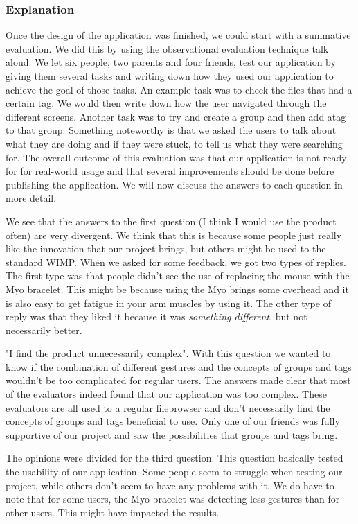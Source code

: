 \documentclass{article}
\begin{document}
\subsubsection{Explanation}

Once the design of the application was finished, we could start with a summative evaluation. We did this by using the observational evaluation technique talk aloud. We let six people, two parents and four friends, test our application by giving them several tasks and writing down how they used our application to achieve the goal of those tasks. An example task was to check the files that had a certain tag. We would then write down how the user navigated through the different screens. Another task was to try and create a group and then add atag to that group. Something noteworthy is that we asked the users to talk about what they are doing and if they were stuck, to tell us what they were searching for. The overall outcome of this evaluation was that our application is not ready for for real-world usage and that several improvements should be done before publishing the application. We will now discuss the answers to each question in more detail.

We see that the answers to the first question (I think I would use the product often) are very divergent. We think that this is because some people just really like the innovation that our project brings, but others might be used to the standard WIMP. When we asked for some feedback, we got two types of replies. The first type was that people didn't see the use of replacing the mouse with the Myo bracelet. This might be because using the Myo brings some overhead and it is also easy to get fatigue in your arm muscles by using it. The other type of reply was that they liked it because it was \textit{something different}, but not necessarily better.

"I find the product unnecessarily complex". With this question we wanted to know if the combination of different gestures and the concepts of groups and tags wouldn't be too complicated for regular users. The answers made clear that most of the evaluators indeed found that our application was too complex. These evaluators are all used to a regular filebrowser and don't necessarily find the concepts of groups and tags beneficial to use. Only one of our friends was fully supportive of our project and saw the possibilities that groups and tags bring.

The opinions were divided for the third question. This question basically tested the usability of our application. Some people seem to struggle when testing our project, while others don't seem to have any problems with it. We do have to note that for some users, the Myo bracelet was detecting less gestures than for other users. This might have impacted the results.
\end{document}
